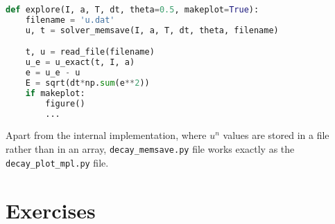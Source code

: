 \documentclass[graybox,sectrefs,envcountresetchap,open=right,final]{svmonodo}
\begin{document}
\begin{lstlisting}[language=Python,style=blue1_bluegreen]
def explore(I, a, T, dt, theta=0.5, makeplot=True):
    filename = 'u.dat'
    u, t = solver_memsave(I, a, T, dt, theta, filename)

    t, u = read_file(filename)
    u_e = u_exact(t, I, a)
    e = u_e - u
    E = sqrt(dt*np.sum(e**2))
    if makeplot:
        figure()
        ...
\end{lstlisting}

Apart from the internal implementation, where $u^n$ values are stored
in a file rather than in an array, \Verb!decay_memsave.py! file works
exactly as the \Verb!decay_plot_mpl.py! file.

\section{Exercises}
\end{document}
